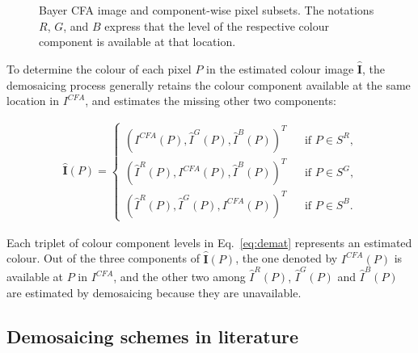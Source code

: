 \documentclass[twoside]{article}
\begin{document}
\begin{figure}[H]
	\caption[Bayer CFA image and component-wise pixel subsets.]{Bayer CFA image and component-wise pixel subsets. The notations $R$, $G$, and $B$ express that the level of the respective colour component is available at that location.}
	\label{fig: Bayer CFA and the component image}
\end{figure}



%


To determine the colour of each pixel $P$ in the estimated colour image $\hat{\textbf{I}}$, the demosaicing process generally retains the colour component available at the same location in $I^{CFA}$, and estimates the missing other two components:

\begin{eqnarray}\hat{\textbf{I}}(P) =
	\left\lbrace
	\begin{array}{ccc}
		\left(I^{CFA}(P),\hat{I}^G(P), \hat{I}^B(P) \right)^T & & \text{if $P \in S^R$,}\\
		\left(\hat{I}^R(P),I^{CFA}(P), \hat{I}^B(P) \right)^T & & \text{if $P \in S^G$,}\\
		\left(\hat{I}^R(P),\hat{I}^G(P), I^{CFA}(P) \right)^T & & \text{if $P \in S^B$.}
	\end{array}\right.
	\label{eq:demat}
\end{eqnarray}

\noindent Each triplet of colour component levels in Eq.~\eqref{eq:demat} represents an estimated colour. Out of the three components of $\hat{\textbf{I}}(P)$, the one denoted by $I^{CFA}(P)$ is available at $P$ in $I^{CFA}$, and the other two among $\hat{I}^R(P)$, $\hat{I}^G(P)$ and $\hat{I}^B(P)$ are estimated by demosaicing because they are unavailable.

\subsection{Demosaicing schemes in literature}
\label{subsec:literature}
\end{document}
